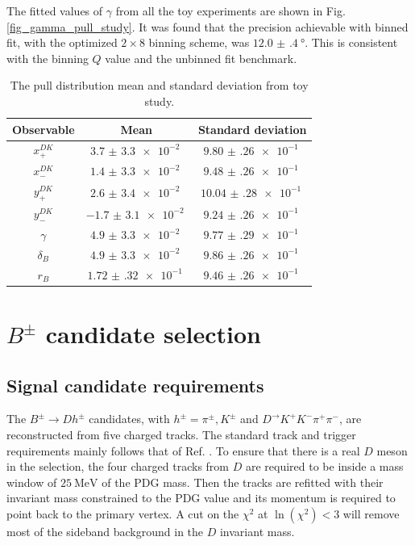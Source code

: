 \documentclass[12pt, a4paper, notitlepage, onecolumn]{article}
\numberwithin{equation}{section}
\begin{document}
The fitted values of $\gamma$ from all the toy experiments are shown in Fig. \ref{fig_gamma_pull_study}. It was found that the precision achievable with binned fit, with the optimized $2\times 8$ binning scheme, was $\SI{12.0(4)}{\degree}$. This is consistent with the binning $Q$ value and the unbinned fit benchmark.

\begin{table}[H]
  \centering
  \caption{The pull distribution mean and standard deviation from toy study.}
  \label{table_pull_study}
  \begin{tabular}{ccc} 
    \toprule
    Observable & Mean                 & Standard deviation \\
    \toprule
    $x_+^{DK}$ & $\SI{3.7(33)e-2}{}$  & $\SI{9.80(26)e-1}{}$ \\
    $x_-^{DK}$ & $\SI{1.4(33)e-2}{}$  & $\SI{9.48(26)e-1}{}$ \\
    $y_+^{DK}$ & $\SI{2.6(34)e-2}{}$  & $\SI{10.04(28)e-1}{}$ \\
    $y_-^{DK}$ & $\SI{-1.7(31)e-2}{}$ & $\SI{9.24(26)e-1}{}$ \\
    $\gamma$   & $\SI{4.9(33)e-2}{}$ & $\SI{9.77(29)e-1}{}$ \\
    $\delta_B$ & $\SI{4.9(33)e-2}{}$ & $\SI{9.86(26)e-1}{}$ \\
    $r_B$      & $\SI{1.72(32)e-1}{}$ & $\SI{9.46(26)e-1}{}$ \\
    \bottomrule
  \end{tabular}
\end{table}

\section{\texorpdfstring{$B^\pm$}{B} candidate selection}
\subsection{Signal candidate requirements}
\noindent The $B^\pm\to Dh^\pm$ candidates, with $h^\pm = \pi^\pm, K^\pm$ and $D^\to K^+K^-\pi^+\pi^-$, are reconstructed from five charged tracks. The standard track and trigger requirements mainly follows that of Ref. \cite{cite_LHCbGGSZKSpipi}. To ensure that there is a real $D$ meson in the selection, the four charged tracks from $D$ are required to be inside a mass window of $\SI{25}{\mega\eV}$ of the PDG mass. Then the tracks are refitted with their invariant mass constrained to the PDG value and its momentum is required to point back to the primary vertex. A cut on the $\chi^2$ at $\ln(\chi^2) < 3$ will remove most of the sideband background in the $D$ invariant mass.
\end{document}
